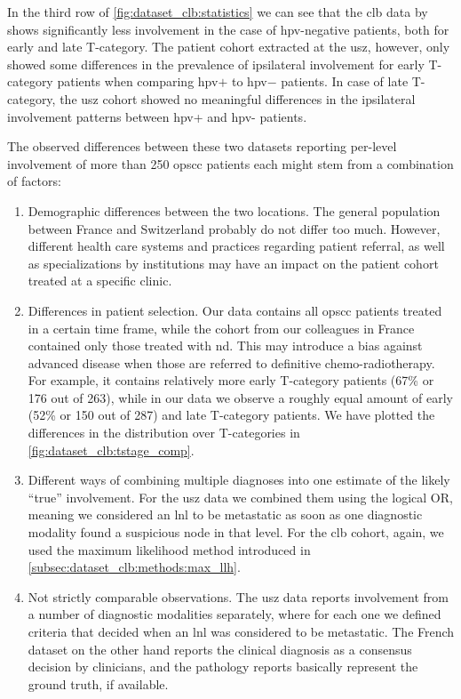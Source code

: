 \documentclass[\relativeRoot/main.tex]{subfiles}
\begin{document}
In the third row of \cref{fig:dataset_clb:statistics} we can see that the \gls{clb} data by  shows significantly less involvement in the case of \gls{hpv}-negative patients, both for early and late T-category. The patient cohort extracted at the \gls{usz}, however, only showed some differences in the prevalence of ipsilateral involvement for early T-category patients when comparing \gls{hpv}$+$ to \gls{hpv}$-$ patients. In case of late T-category, the \gls{usz} cohort showed no meaningful differences in the ipsilateral involvement patterns between \gls{hpv}+ and \gls{hpv}- patients.

The observed differences between these two datasets reporting per-level involvement of more than 250 \gls{opscc} patients each might stem from a combination of factors:

\begin{enumerate}
    \item Demographic differences between the two locations. The general population between France and Switzerland probably do not differ too much. However, different health care systems and practices regarding patient referral, as well as specializations by institutions may have an impact on the patient cohort treated at a specific clinic.
    \item Differences in patient selection. Our data contains all \gls{opscc} patients treated in a certain time frame, while the cohort from our colleagues in France contained only those treated with \acrlong{nd}. This may introduce a bias against advanced disease when those are referred to definitive chemo-radiotherapy. For example, it contains relatively more early T-category patients (67\% or 176 out of 263), while in our data we observe a roughly equal amount of early (52\% or 150 out of 287) and late T-category patients. We have plotted the differences in the distribution over T-categories in \cref{fig:dataset_clb:tstage_comp}.
    \item Different ways of combining multiple diagnoses into one estimate of the likely ``true'' involvement. For the \gls{usz} data we combined them using the logical OR, meaning we considered an \gls{lnl} to be metastatic as soon as one diagnostic modality found a suspicious node in that level. For the \gls{clb} cohort, again, we used the maximum likelihood method introduced in \cref{subsec:dataset_clb:methods:max_llh}.
    \item Not strictly comparable observations. The \gls{usz} data reports involvement from a number of diagnostic modalities separately, where for each one we defined criteria that decided when an \gls{lnl} was considered to be metastatic. The French dataset on the other hand reports the clinical diagnosis as a consensus decision by clinicians, and the pathology reports basically represent the ground truth, if available.
\end{enumerate}
\end{document}
